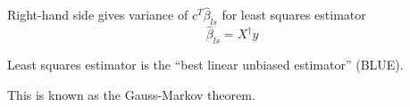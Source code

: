 \begin{corollary}
    Right-hand side gives variance of $ c^{T} \hat{\beta}_{{ls}} $ for least squares estimator
\begin{equation}
\hat{\beta}_{{ls}}=X^{\dagger} y
\end{equation}
\end{corollary}

\begin{theorem}
    Least squares estimator is the ``best linear unbiased estimator'' (BLUE).
\end{theorem}

This is known as the Gauss-Markov theorem.


